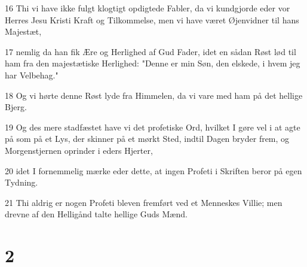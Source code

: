 \par 16 Thi vi have ikke fulgt klogtigt opdigtede Fabler, da vi kundgjorde eder vor Herres Jesu Kristi Kraft og Tilkommelse, men vi have været Øjenvidner til hans Majestæt,
\par 17 nemlig da han fik Ære og Herlighed af Gud Fader, idet en sådan Røst lød til ham fra den majestætiske Herlighed: "Denne er min Søn, den elskede, i hvem jeg har Velbehag."
\par 18 Og vi hørte denne Røst lyde fra Himmelen, da vi vare med ham på det hellige Bjerg.
\par 19 Og des mere stadfæstet have vi det profetiske Ord, hvilket I gøre vel i at agte på som på et Lys, der skinner på et mørkt Sted, indtil Dagen bryder frem, og Morgenstjernen oprinder i eders Hjerter,
\par 20 idet I fornemmelig mærke eder dette, at ingen Profeti i Skriften beror på egen Tydning.
\par 21 Thi aldrig er nogen Profeti bleven fremført ved et Menneskes Villie; men drevne af den Helligånd talte hellige Guds Mænd.

\chapter{2}

